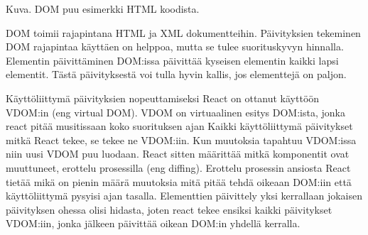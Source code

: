Kuva\getImgCount .{} DOM puu esimerkki HTML koodista. 
\medskip



DOM toimii rajapintana HTML ja XML dokumentteihin.
Päivityksien tekeminen DOM rajapintaa käyttäen on helppoa, mutta se tulee suorituskyvyn hinnalla.
Elementin päivittäminen DOM:issa päivittää kyseisen elementin kaikki lapsi elementit. 
Tästä päivityksestä voi tulla hyvin kallis, jos elementtejä on paljon.

\bigskip




Käyttöliittymä päivityksien nopeuttamiseksi React on ottanut käyttöön VDOM:in (eng virtual DOM).
VDOM on virtuaalinen esitys DOM:ista, jonka react pitää musitissaan koko suorituksen ajan
Kaikki käyttöliittymä päivitykset mitkä React tekee, se tekee ne VDOM:iin.
Kun muutoksia tapahtuu VDOM:issa niin uusi VDOM puu luodaan. React sitten määrittää mitkä komponentit ovat muuttuneet, erottelu prosessilla (eng diffing).
Erottelu prosessin ansiosta React tietää mikä on pienin määrä muutoksia mitä pitää tehdä oikeaan DOM:iin että käyttöliittymä pysyisi ajan tasalla.
Elementtien päivittely yksi kerrallaan jokaisen päivityksen ohessa olisi hidasta,
joten react tekee ensiksi kaikki päivitykset VDOM:iin, jonka jälkeen päivittää oikean DOM:in yhdellä kerralla.\citemissing
\medskip



